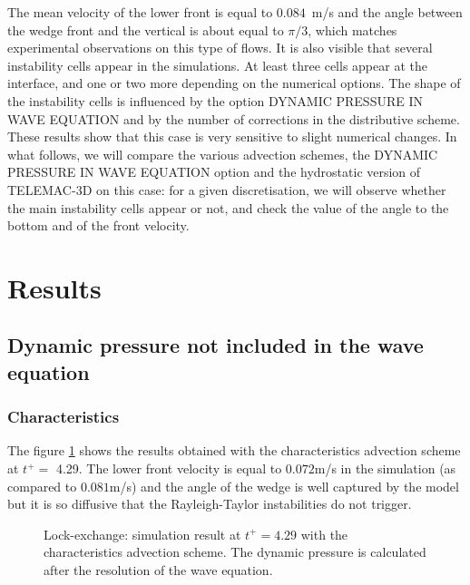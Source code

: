 The mean velocity of the lower front is equal to $0.084$~m/s and the angle between the wedge front and the
vertical is about equal to $\pi/3$, which matches experimental observations on this type of flows.
It is also visible that several instability cells appear in the simulations. At least three cells appear at the interface,
and one or two more depending on the numerical options.
The shape of the instability cells is influenced by the option DYNAMIC PRESSURE IN WAVE EQUATION
and by the number of corrections in the distributive scheme.
These results show that this case is very sensitive to slight numerical changes.
In what follows, we will compare the various advection schemes, the DYNAMIC PRESSURE IN WAVE EQUATION option and
the hydrostatic version of TELEMAC-3D on this case: for a given discretisation, we will observe whether the
main instability cells appear or not, and check the value of the angle to the bottom and of the front velocity.
%
%
%
\section{Results}
%
\subsection{Dynamic pressure not included in the wave equation}

\subsubsection{Characteristics}

The figure \ref{fig:lock-exchange_dp_no_carac} shows the results obtained with the characteristics advection scheme at $t^+=$ 4.29.
The lower front velocity is equal to $0.072$m/s in the simulation (as compared to $0.081$m/s) and the angle of the wedge is well captured
by the model but it is so diffusive that the Rayleigh-Taylor instabilities do not trigger.
\begin{figure}[ht]
  \begin{center}
    \caption{Lock-exchange: simulation result at $t^+=4.29$ with the characteristics advection scheme.
      The dynamic pressure is calculated after the resolution of the wave equation.}
    \label{fig:lock-exchange_dp_no_carac}
  \end{center}
\end{figure}

